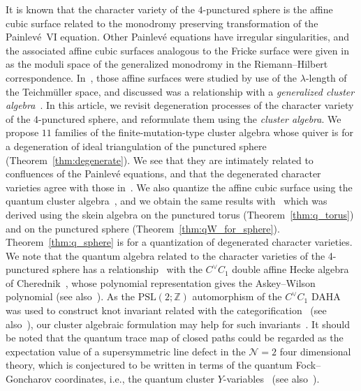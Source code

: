 \documentclass[10pt,a4paper]{amsart}
\numberwithin{equation}{section}
\begin{document}
It is known that the character variety of the $4$-punctured sphere is the affine cubic surface related to the monodromy preserving transformation of the Painlev{\'e}~VI equation. Other Painlev{\'e} equations have irregular singularities, and the associated affine cubic surfaces analogous to the Fricke surface were given in~\cite{vdPutSaito09a} as the moduli space of the generalized monodromy in the Riemann--Hilbert correspondence.
In~\cite{ChekMazzRubt15a}, those affine surfaces were studied by use of the $\lambda$-length of the Teichm{\"u}ller space, and discussed was a relationship with a \emph{generalized cluster algebra}~\cite{ChekhShapi14a}.
In this article, we revisit degeneration processes of the character variety of the $4$-punctured sphere, and reformulate them using the \emph{cluster algebra}. We propose $11$ families of the finite-mutation-type cluster algebra whose quiver is for a degeneration of ideal triangulation of the punctured sphere (Theorem~\ref{thm:degenerate}). We see that they are intimately related to confluences of the Painlev{\'e} equations, and that the degenerated character varieties agree with those in~\cite{vdPutSaito09a}. We also quantize the affine cubic surface using the quantum cluster algebra~\cite{BerenZelev05a,FockGonc09a}, and we obtain the same results with~\cite{BulloPrzyt99a} which was derived using the skein algebra on the punctured torus (Theorem~\ref{thm:q_torus}) and on the punctured sphere (Theorem~\ref{thm:qW_for_sphere}). Theorem~\ref{thm:q_sphere} is for a quantization of degenerated character varieties. We note that the quantum algebra related to the character varieties of the 4-punctured sphere has a relationship~\cite{Oblom04a} with the $C^\vee C_1$ double affine Hecke algebra of Cherednik~\cite{Chered05Book}, whose polynomial representation gives the Askey--Wilson polynomial (see also~\cite{Koorn08a,Terwil13a}). As the $\mathrm{PSL}(2;\mathbb{Z})$ automorphism of the $C^\vee C_1$ DAHA was used to construct knot invariant related with the categorification~\cite{IChered16a} (see also~\cite{BerestSamuel16a}), our cluster algebraic formulation may help for such invariants~\cite{Hikami}. It should be noted that
the quantum trace map of closed paths could be regarded as the expectation value of a supersymmetric line defect in the $\mathcal{N}=2$ four dimensional theory, which is conjectured to be written in terms of the quantum
Fock--Goncharov coordinates, i.e., the quantum cluster $Y$-variables~\cite{GaioMoorNeit13a} (see also~\cite{MGabel17a}).
\end{document}

